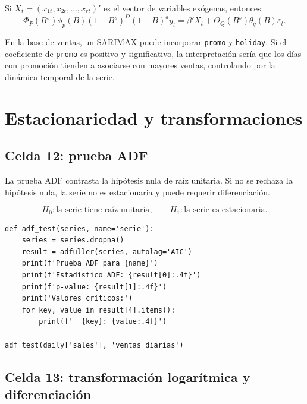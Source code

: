 \documentclass[11pt,letterpaper]{article}
\newcommand{\code}[1]{\texttt{#1}}
\begin{document}
\begin{latexcell}
Si \(X_t=(x_{1t},x_{2t},\ldots,x_{rt})'\) es el vector de variables exógenas, entonces:
\[
\Phi_P(B^s)\phi_p(B)(1-B^s)^D(1-B)^d y_t
= \beta'X_t + \Theta_Q(B^s)\theta_q(B)\varepsilon_t.
\]
\end{latexcell}

\begin{interpretacion}
En la base de ventas, un SARIMAX puede incorporar \code{promo} y \code{holiday}. Si el coeficiente de \code{promo} es positivo y significativo, la interpretación sería que los días con promoción tienden a asociarse con mayores ventas, controlando por la dinámica temporal de la serie.
\end{interpretacion}

\section{Estacionariedad y transformaciones}

\subsection{Celda 12: prueba ADF}

\begin{markdowncell}
La prueba ADF contrasta la hipótesis nula de raíz unitaria. Si no se rechaza la hipótesis nula, la serie no es estacionaria y puede requerir diferenciación.
\end{markdowncell}

\begin{latexcell}
\[
H_0: \text{la serie tiene raíz unitaria},
\qquad
H_1: \text{la serie es estacionaria}.
\]
\end{latexcell}

\begin{lstlisting}[style=pythoncolab]
def adf_test(series, name='serie'):
    series = series.dropna()
    result = adfuller(series, autolag='AIC')
    print(f'Prueba ADF para {name}')
    print(f'Estadístico ADF: {result[0]:.4f}')
    print(f'p-value: {result[1]:.4f}')
    print('Valores críticos:')
    for key, value in result[4].items():
        print(f'  {key}: {value:.4f}')

adf_test(daily['sales'], 'ventas diarias')
\end{lstlisting}

\subsection{Celda 13: transformación logarítmica y diferenciación}
\end{document}
